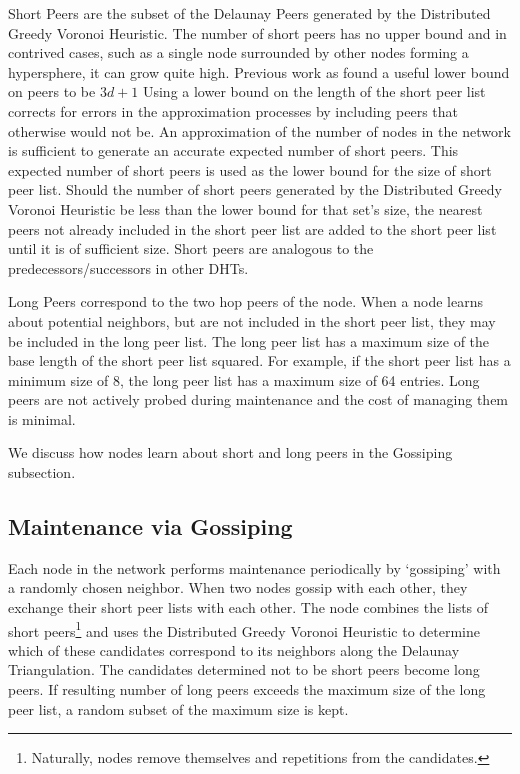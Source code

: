 \documentclass{IEEEtran}
\begin{document}
Short Peers are the subset of the Delaunay Peers generated by the Distributed Greedy Voronoi Heuristic. 
The number of short peers has no upper bound and in contrived cases, such as a single node surrounded by other nodes forming a hypersphere, it can grow quite high. Previous work as found a useful lower bound on peers to be $3d + 1$\cite{raynet}
Using a lower bound on the length of the short peer list corrects for errors in the approximation processes by including peers that otherwise would not be. 
An approximation of the number of nodes in the network is sufficient to generate an accurate expected number of short peers.  
This expected number of short peers is used as the lower bound for the size of short peer list.
Should the number of short peers generated by the Distributed Greedy Voronoi Heuristic be less than the lower bound for that set's size, the nearest peers not already included in the short peer list are added to the short peer list until it is of sufficient size.
Short peers are analogous to the predecessors/successors in other DHTs.

Long Peers correspond to the two hop peers of the node.
When a node learns about potential neighbors, but are not included in the short peer list, they may be included in the long peer list.  
The long peer list has a maximum size of the base length of the short peer list squared.  
For example, if the short peer list has a minimum size of 8, the long peer list has a maximum size of 64 entries.  
Long peers are not actively probed during maintenance and the cost of managing them is minimal.
 
We discuss how nodes learn about short and long peers in the Gossiping subsection.


\subsection{Maintenance via Gossiping}
Each node in the network performs maintenance periodically by `gossiping' with a randomly chosen neighbor.
When two nodes gossip with each other, they exchange their short peer lists with each other.
The node combines the lists of short peers\footnote{Naturally, nodes remove themselves and repetitions from the candidates.} and uses the  Distributed Greedy Voronoi Heuristic to determine which of these candidates correspond to its neighbors along the Delaunay Triangulation.
The candidates determined not to be short peers become long peers.  
If resulting number of long peers exceeds the maximum size of the long peer list, a random subset of the maximum size is kept.
\end{document}
